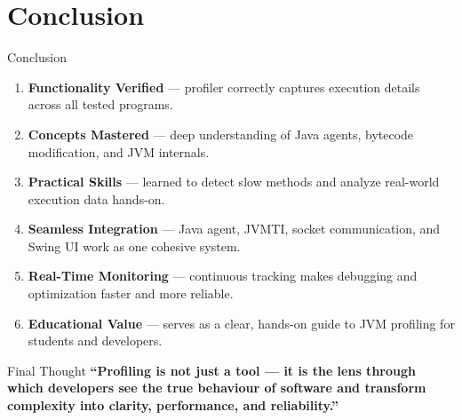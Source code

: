 \documentclass[aspectratio=169]{beamer}
\begin{document}
\section{Conclusion}

\begin{frame}{Conclusion}
        \begin{enumerate}\small\itemsep4pt
          \item \textbf{Functionality Verified} — profiler correctly captures execution
                details across all tested programs.
          \item \textbf{Concepts Mastered} — deep understanding of Java agents,
                bytecode modification, and JVM internals.
          \item \textbf{Practical Skills} — learned to detect slow methods and analyze
                real-world execution data hands-on.
          \item \textbf{Seamless Integration} — Java agent, JVMTI, socket communication,
                and Swing UI work as one cohesive system.
          \item \textbf{Real-Time Monitoring} — continuous tracking makes debugging and
                optimization faster and more reliable.
          \item \textbf{Educational Value} — serves as a clear, hands-on guide to JVM
                profiling for students and developers.
        \end{enumerate}
  \begin{alertblock}{Final Thought}
    \centering
    \textbf{``Profiling is not just a tool — it is the lens through which
    developers see the true behaviour of software and transform complexity
    into clarity, performance, and reliability.''}
  \end{alertblock}
\end{frame}

\end{document}
